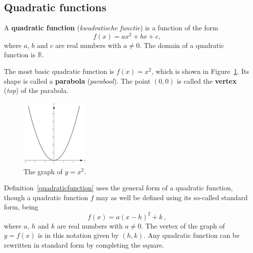 \subsection{Quadratic functions}

\begin{definition} \label{quadraticfunction} 
A     \textbf{quadratic function} (\textit{kwadratische functie}) is a function of the form \[ f(x) = ax^2 + bx + c,\] where $a$, $b$ and $c$ are real numbers with $a \neq 0$.  The domain of a quadratic function is $\mathbb{R}$.%

\end{definition}
The most basic quadratic function is $f(x) = x^2$, which is shown in Figure~\ref{fig_algebraic_1}.  Its shape is called a \textbf{parabola} (\textit{parabool}). The point $(0,0)$ is called the \textbf{vertex} (\textit{top}) of the parabola. 

\begin{figure}[H]
	\begin{center}
			\includegraphics[width=0.3\textwidth]{fig_algebraic_1}
	\caption{The graph of $y=x^2$.}
	\label{fig_algebraic_1}
	\end{center}
\end{figure}

Definition~\ref{quadraticfunction} uses the general form of a quadratic function, though a quadratic function $f$ may as well be defined using its so-called standard form, being
$$f(x) = a(x-h)^2 + k\,,$$ 
where $a$, $h$ and $k$ are real numbers with $a\neq 0$. The vertex of the graph of $y=f(x)$ is in this notation given by $(h,k)$.  Any quadratic function can be rewritten in standard form by completing the square.




